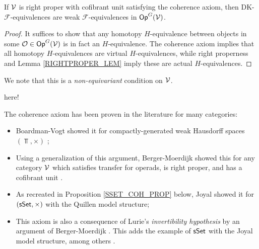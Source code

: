 \documentclass[a4paper,10pt
,draft
]{article}%
\renewcommand{\F}{\mathcal F}
\renewcommand{\1}{\eta}%
\begin{document}
\begin{proposition}[{cf. \cite[Prop. 2.20]{BM13}}]
      \label{COH_DK_ARE_WE_PROP}
      If $\mathcal V$ is right proper with cofibrant unit satisfying the coherence axiom, then
      DK-$\F$-equivalences are weak $\F$-equivalences in $\mathsf{Op}^G(\mathcal V)$.
\end{proposition}
\begin{proof}
      It suffices to show that any homotopy $H$-equivalence between objects in some $\mathcal{O} \in \mathsf{Op}^G(\mathcal V)$
      is in fact an $H$-equivalence.
      The coherence axiom implies that all homotopy $H$-equivalences are virtual $H$-equivalences,
      while right properness and Lemma \ref{RIGHTPROPER_LEM} imply these are actual $H$-equivalences.
\end{proof}

\begin{remark}
      We note that this is a \textit{non-equivariant} condition on $\mathcal V$.
\end{remark}

here!

The coherence axiom has been proven in the literature for many categories:
\begin{itemize}      
\item Boardman-Vogt showed it for compactly-generated weak Hausdorff spaces $(\Top, \times)$ \cite[Lem. 4.16]{BV73};
\item Using a generalization of this argument, Berger-Moerdijk showed this for any category $\mathcal V$ which satisfies transfer for operads, is right proper, and has a cofibrant unit \cite[Prop. 2.24]{BM13}.
\item As recreated in Proposition \ref{SSET_COH_PROP} below, Joyal showed it for $(\mathsf{sSet}, \times)$ with the Quillen model structure;
\item This axiom is also a consequence of Lurie's \textit{invertibility hypothesis} \cite[A.3.2.12]{Lur09} by an argument of Berger-Moerdijk \cite[Rem. 2.19]{BM13}.
      This adds the example of $\mathsf{sSet}$ with the Joyal model structure, among others \cite[A.3.2.23]{Lur09}.
\end{itemize}
\end{document}
